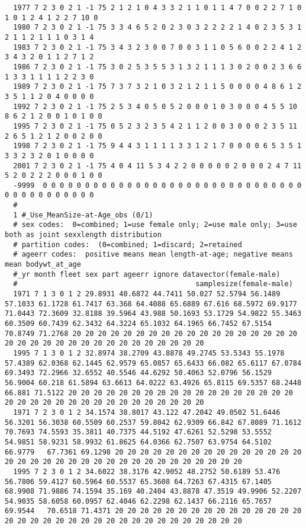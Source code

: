 \begin{landscape}
{\begin{verbatim}
  1977 7 2 3 0 2 1 -1 75 2 1 2 1 0 4 3 3 2 1 1 0 1 1 4 7 0 0 2 2 7 1 0 1 0 1 2 4 1 2 2 7 10 0
  1980 7 2 3 0 2 1 -1 75 3 3 4 6 5 2 0 2 3 0 3 2 2 2 2 1 4 0 2 3 5 3 1 2 1 1 2 1 1 1 0 3 1 4
  1983 7 2 3 0 2 1 -1 75 3 4 3 2 3 0 0 7 0 0 3 1 1 0 5 6 0 0 2 2 4 1 2 3 4 3 2 0 1 1 2 7 1 2
  1986 7 2 3 0 2 1 -1 75 3 0 2 5 3 5 5 3 1 3 2 1 1 1 3 0 2 0 0 2 3 6 6 1 3 3 1 1 1 1 2 2 3 0
  1989 7 2 3 0 2 1 -1 75 7 3 7 3 2 1 0 3 2 1 2 1 1 5 0 0 0 0 4 8 6 1 2 3 5 1 1 2 0 4 0 0 0 0
  1992 7 2 3 0 2 1 -1 75 2 5 3 4 0 5 0 5 2 0 0 0 1 0 3 0 0 0 4 5 5 10 8 6 2 1 2 0 0 1 0 1 0 0
  1995 7 2 3 0 2 1 -1 75 0 5 2 3 2 3 5 4 2 1 1 2 0 0 3 0 0 0 2 3 5 11 2 6 5 1 2 1 2 0 0 2 0 0
  1998 7 2 3 0 2 1 -1 75 9 4 4 3 1 1 1 1 3 3 1 2 1 7 0 0 0 0 6 5 3 5 1 3 3 2 3 2 0 1 0 0 0 0
  2001 7 2 3 0 2 1 -1 75 4 0 4 11 5 3 4 2 2 0 0 0 0 0 2 0 0 0 2 4 7 11 5 2 0 2 2 2 0 0 0 1 0 0
  -9999  0 0 0 0 0 0 0 0 0 0 0 0 0 0 0 0 0 0 0 0 0 0 0 0 0 0 0 0 0 0 0 0 0 0 0 0 0 0 0 0 0 0
  #
  1 #_Use_MeanSize-at-Age_obs (0/1)
  # sex codes:  0=combined; 1=use female only; 2=use male only; 3=use both as joint sexxlength distribution
  # partition codes:  (0=combined; 1=discard; 2=retained
  # ageerr codes:  positive means mean length-at-age; negative means mean bodywt_at_age
  #_yr month fleet sex part ageerr ignore datavector(female-male)
  #                                          samplesize(female-male)
  1971 7 1 3 0 1 2 29.8931 40.6872 44.7411 50.027 52.5794 56.1489 57.1033 61.1728 61.7417 63.368 64.4088 65.6889 67.616 68.5972 69.9177 71.0443 72.3609 32.8188 39.5964 43.988 50.1693 53.1729 54.9822 55.3463 60.3509 60.7439 62.3432 64.3224 65.1032 64.1965 66.7452 67.5154   70.8749 71.2768 20 20 20 20 20 20 20 20 20 20 20 20 20 20 20 20 20 20 20 20 20 20 20 20 20 20 20 20 20 20 20 20 20 20
  1995 7 1 3 0 1 2 32.8974 38.2709 43.8878 49.2745 53.5343 55.1978 57.4389 62.0368 62.1445 62.9579 65.0857 65.6433 66.082 65.6117 67.0784 69.3493 72.2966 32.6552 40.5546 44.6292 50.4063 52.0796 56.1529 56.9004 60.218 61.5894 63.6613 64.0222 63.4926 65.8115 69.5357 68.2448   66.881 71.5122 20 20 20 20 20 20 20 20 20 20 20 20 20 20 20 20 20 20 20 20 20 20 20 20 20 20 20 20 20 20 20 20 20 20
  1971 7 2 3 0 1 2 34.1574 38.8017 43.122 47.2042 49.0502 51.6446 56.3201 56.3038 60.5509 60.2537 59.8042 62.9309 66.842 67.8089 71.1612 70.7693 74.5593 35.3811 40.7375 44.5192 47.6261 52.5298 53.5552 54.9851 58.9231 58.9932 61.8625 64.0366 62.7507 63.9754 64.5102 66.9779   67.7361 69.1298 20 20 20 20 20 20 20 20 20 20 20 20 20 20 20 20 20 20 20 20 20 20 20 20 20 20 20 20 20 20 20 20 20 20
  1995 7 2 3 0 1 2 34.6022 38.3176 42.9052 48.2752 50.6189 53.476 56.7806 59.4127 60.5964 60.5537 65.3608 64.7263 67.4315 67.1405 68.9908 71.9886 74.1594 35.169 40.2404 43.8878 47.3519 49.9906 52.2207 54.9035 58.6058 60.0957 62.4046 62.2298 62.1437 66.2116 65.7657 69.9544   70.6518 71.4371 20 20 20 20 20 20 20 20 20 20 20 20 20 20 20 20 20 20 20 20 20 20 20 20 20 20 20 20 20 20 20 20 20 20

\end{verbatim}}
\end{landscape}
